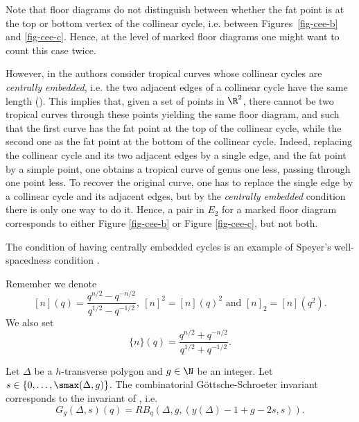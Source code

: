 \begin{rema}\label{rk-doublecount}
Note that floor diagrams do not distinguish between whether the fat point is at the top or bottom vertex of the collinear cycle, i.e.  between Figures~\ref{fig-cee-b} and \ref{fig-cee-c}. Hence, at the level of marked floor diagrams one might want to count this case twice.

 However, in \cite{shustin-2024-refined} the authors consider tropical curves whose collinear cycles are \emph{centrally embedded}, i.e.  the two adjacent edges of a collinear cycle have the same length (\cite[Lemma~4.6]{shustin-2024-refined}). This implies that, given a set of points in $\R^2$, there cannot be two tropical curves through these points yielding the same floor diagram, and such that the first curve has the fat point at the top of the collinear cycle, while the second one as the fat point at the bottom of the collinear cycle.
 Indeed, replacing the collinear cycle and its two adjacent edges by a single edge, and the fat point by a simple point, one obtains a tropical curve of genus one less, passing through one point less. To recover the original curve, one has to replace the single edge by a collinear cycle and its adjacent edges, but by the \emph{centrally embedded} condition there is only one way to do it. 
 Hence, a pair in $E_2$ for a marked floor diagram corresponds to either Figure \ref{fig-cee-b} or Figure \ref{fig-cee-c}, but not both.
\end{rema}

\begin{rema}
The condition of having centrally embedded cycles is an example of Speyer's well-spacedness condition \cite{speyer-2014-parametrizing}.
\end{rema}



Remember we denote 
\[ [n](q) = \dfrac{q^{n/2}-q^{-n/2}}{q^{1/2}-q^{-1/2}},\ [n]^2 = [n](q)^2 \text{ and } [n]_2 = [n](q^2). \]
We also set
\[ \{n\}(q) = \dfrac{q^{n/2}+q^{-n/2}}{q^{1/2}+q^{-1/2}} . \]




\begin{prop}\label{prop-equal-shustin}
Let $\Delta$ be a $h$-transverse polygon and $g\in\N$ be an integer. Let $s\in \{0,\dots,\smax(\Delta,g)\}$. The combinatorial Göttsche-Schroeter invariant corresponds to the invariant of \cite{shustin-2024-refined}, i.e. 
\[ G_g(\Delta,s)(q) = RB_q(\Delta,g,(y(\Delta)-1+g-2s,s)) . \]
\end{prop}


